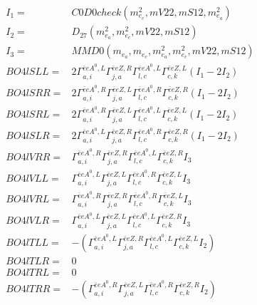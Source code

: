 \documentclass[A4,landscape]{article}
\begin{document}
\begin{align} 
I_1 = & C0D0check(m^2_{e_{{c}}}, mV22, mS12, m^2_{e_{{a}}}) \\ 
I_2 = & D_{27}(m^2_{e_{{a}}}, m^2_{e_{{c}}}, mV22, mS12) \\ 
I_3 = & MMD0(m_{e_{{a}}}, m_{e_{{c}}}, m^2_{e_{{a}}}, m^2_{e_{{c}}}, mV22, mS12) \\ 
  BO4lSLL= & 2  \Gamma^{\bar{e}e A^0 ,L}_{a, i} \Gamma^{\bar{e}e Z ,R}_{j, a} \Gamma^{\bar{e}e A^0 ,L}_{l, c} \Gamma^{\bar{e}e Z ,L}_{c, k} (I_1 - 2 I_2) \\ 
  BO4lSRR= & 2  \Gamma^{\bar{e}e A^0 ,R}_{a, i} \Gamma^{\bar{e}e Z ,L}_{j, a} \Gamma^{\bar{e}e A^0 ,R}_{l, c} \Gamma^{\bar{e}e Z ,R}_{c, k} (I_1 - 2 I_2) \\ 
  BO4lSRL= & 2  \Gamma^{\bar{e}e A^0 ,R}_{a, i} \Gamma^{\bar{e}e Z ,L}_{j, a} \Gamma^{\bar{e}e A^0 ,L}_{l, c} \Gamma^{\bar{e}e Z ,L}_{c, k} (I_1 - 2 I_2) \\ 
  BO4lSLR= & 2  \Gamma^{\bar{e}e A^0 ,L}_{a, i} \Gamma^{\bar{e}e Z ,R}_{j, a} \Gamma^{\bar{e}e A^0 ,R}_{l, c} \Gamma^{\bar{e}e Z ,R}_{c, k} (I_1 - 2 I_2) \\ 
  BO4lVRR= &  \Gamma^{\bar{e}e A^0 ,R}_{a, i} \Gamma^{\bar{e}e Z ,R}_{j, a} \Gamma^{\bar{e}e A^0 ,L}_{l, c} \Gamma^{\bar{e}e Z ,R}_{c, k} I_3 \\ 
  BO4lVLL= &  \Gamma^{\bar{e}e A^0 ,L}_{a, i} \Gamma^{\bar{e}e Z ,L}_{j, a} \Gamma^{\bar{e}e A^0 ,R}_{l, c} \Gamma^{\bar{e}e Z ,L}_{c, k} I_3 \\ 
  BO4lVRL= &  \Gamma^{\bar{e}e A^0 ,R}_{a, i} \Gamma^{\bar{e}e Z ,R}_{j, a} \Gamma^{\bar{e}e A^0 ,R}_{l, c} \Gamma^{\bar{e}e Z ,L}_{c, k} I_3 \\ 
  BO4lVLR= &  \Gamma^{\bar{e}e A^0 ,L}_{a, i} \Gamma^{\bar{e}e Z ,L}_{j, a} \Gamma^{\bar{e}e A^0 ,L}_{l, c} \Gamma^{\bar{e}e Z ,R}_{c, k} I_3 \\ 
  BO4lTLL= & -( \Gamma^{\bar{e}e A^0 ,L}_{a, i} \Gamma^{\bar{e}e Z ,R}_{j, a} \Gamma^{\bar{e}e A^0 ,L}_{l, c} \Gamma^{\bar{e}e Z ,L}_{c, k} I_2) \\ 
  BO4lTLR= & 0 \\ 
  BO4lTRL= & 0 \\ 
  BO4lTRR= & -( \Gamma^{\bar{e}e A^0 ,R}_{a, i} \Gamma^{\bar{e}e Z ,L}_{j, a} \Gamma^{\bar{e}e A^0 ,R}_{l, c} \Gamma^{\bar{e}e Z ,R}_{c, k} I_2) \\ 
\end{align} 
\end{document}
